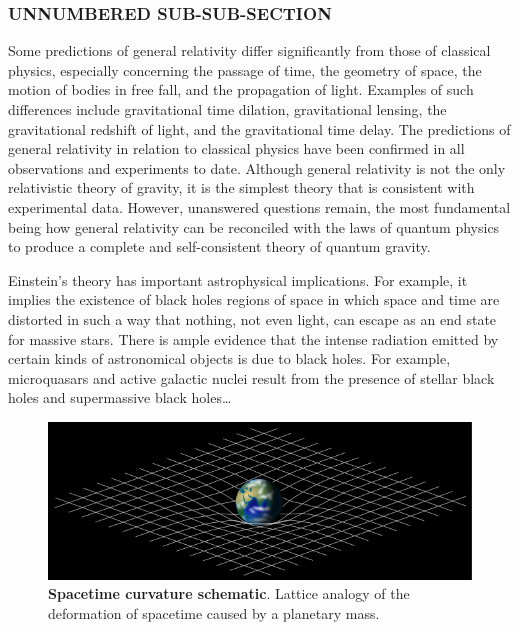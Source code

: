 \documentclass[
	a4paper,
	twocolumn
	]{article}
\begin{document}
\subsubsection*{UNNUMBERED SUB-SUB-SECTION}
Some predictions of general relativity differ significantly from those of
classical physics, especially concerning the passage of time, the geometry of
space, the motion of bodies in free fall, and the propagation of light. Examples
of such differences include gravitational time dilation, gravitational lensing,
the gravitational redshift of light, and the gravitational time delay. The
predictions of general relativity in relation to classical physics have been
confirmed in all observations and experiments to date. Although general
relativity is not the only relativistic theory of gravity, it is the simplest
theory that is consistent with experimental data. However, unanswered questions
remain, the most fundamental being how general relativity can be reconciled with
the laws of quantum physics to produce a complete and self-consistent theory of
quantum gravity.

Einstein's theory has important astrophysical implications. For example, it
implies the existence of black holes regions of space in which space and time
are distorted in such a way that nothing, not even light, can escape as an
end state for massive stars. There is ample evidence that the intense radiation
emitted by certain kinds of astronomical objects is due to black holes. For
example, microquasars and active galactic nuclei result from the presence of
stellar black holes and supermassive black holes\ldots


\vfill\null

\begin{figure}[b]
\begin{center}
\includegraphics[width=.47\textwidth]{img/image1.png}
\caption{\textbf{Spacetime curvature schematic}. Lattice analogy of the deformation
of spacetime caused by a planetary mass.}
\label{gr01}
\end{center}
\end{figure}

\newpage %
\end{document}
